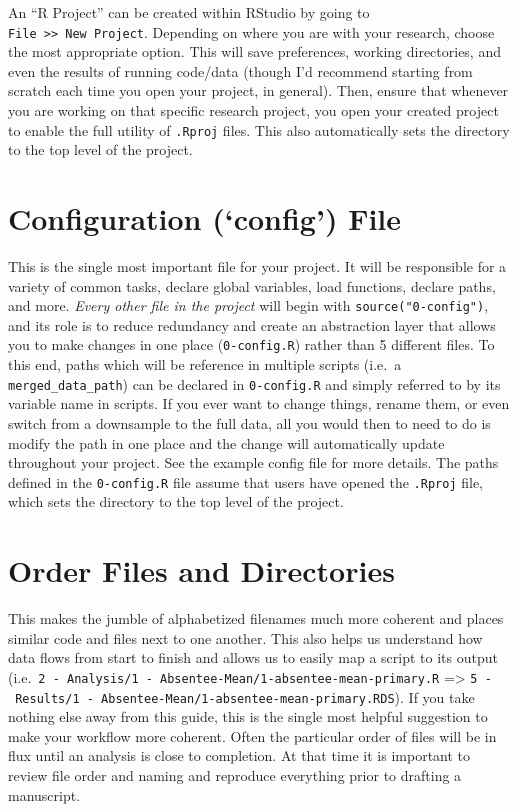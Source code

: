 \documentclass[
]{book}
\begin{document}
An ``R Project'' can be created within RStudio by going to \texttt{File\ \textgreater{}\textgreater{}\ New\ Project}. Depending on where you are with your research, choose the most appropriate option. This will save preferences, working directories, and even the results of running code/data (though I'd recommend starting from scratch each time you open your project, in general). Then, ensure that whenever you are working on that specific research project, you open your created project to enable the full utility of \texttt{.Rproj} files. This also automatically sets the directory to the top level of the project.

\section{Configuration (`config') File}\label{configuration-config-file}

This is the single most important file for your project. It will be responsible for a variety of common tasks, declare global variables, load functions, declare paths, and more. \emph{Every other file in the project} will begin with \texttt{source("0-config")}, and its role is to reduce redundancy and create an abstraction layer that allows you to make changes in one place (\texttt{0-config.R}) rather than 5 different files. To this end, paths which will be reference in multiple scripts (i.e.~a \texttt{merged\_data\_path}) can be declared in \texttt{0-config.R} and simply referred to by its variable name in scripts. If you ever want to change things, rename them, or even switch from a downsample to the full data, all you would then to need to do is modify the path in one place and the change will automatically update throughout your project. See the example config file for more details. The paths defined in the \texttt{0-config.R} file assume that users have opened the \texttt{.Rproj} file, which sets the directory to the top level of the project.

\section{Order Files and Directories}\label{order-files-and-directories}

This makes the jumble of alphabetized filenames much more coherent and places similar code and files next to one another. This also helps us understand how data flows from start to finish and allows us to easily map a script to its output (i.e.~\texttt{2\ -\ Analysis/1\ -\ Absentee-Mean/1-absentee-mean-primary.R} =\textgreater{} \texttt{5\ -\ Results/1\ -\ Absentee-Mean/1-absentee-mean-primary.RDS}). If you take nothing else away from this guide, this is the single most helpful suggestion to make your workflow more coherent. Often the particular order of files will be in flux until an analysis is close to completion. At that time it is important to review file order and naming and reproduce everything prior to drafting a manuscript.
\end{document}
